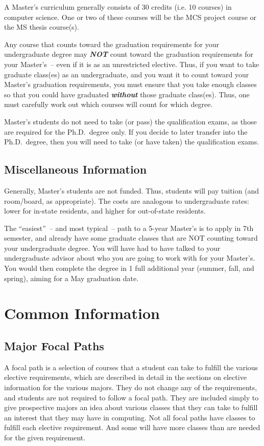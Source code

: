 \documentclass[10pt,letter]{book}
\newcommand{\mychapter}[2]{\chapter{#1}\renewcommand{\leftmark}{\textsc{#2}}}
\newcommand{\mysection}[1]{\section{#1}\renewcommand{\rightmark}{#1}}
\begin{document}
A Master's curriculum generally consists of 30 credits (i.e. 10
courses) in computer science.  One or two of these courses will be the
MCS project course or the MS thesis course(s).

Any course that counts toward the graduation requirements for your
undergraduate degree may {\em\bf NOT} count toward the graduation
requirements for your Master's~-- even if it is as an unrestricted
elective.  Thus, if you want to take graduate class(es) as an
undergraduate, and you want it to count toward your Master's
graduation requirements, you must ensure that you take enough classes
so that you could have graduated {\em\bf without} those graduate
class(es).  Thus, one must carefully work out which courses will count
for which degree.

Master's students do not need to take (or pass) the qualification
exams, as those are required for the Ph.D.\ degree only.  If you
decide to later transfer into the Ph.D.\ degree, then you will need to
take (or have taken) the qualification exams.

\mysection{Miscellaneous Information}

Generally, Master's students are not funded.  Thus, students will pay
tuition (and room/board, as appropriate).  The costs are analogous to
undergraduate rates: lower for in-state residents, and higher for
out-of-state residents.

The ``easiest''~-- and most typical~-- path to a 5-year Master's is to
apply in 7th semester, and already have some graduate classes that are
NOT counting toward your undergraduate degree.  You will have had to
have talked to your undergraduate advisor about who you are going to
work with for your Master's.  You would then complete the degree in 1
full additional year (summer, fall, and spring), aiming for a May
graduation date.


\clearpage
\mychapter{Common Information}{Common Information}

\mysection{Major Focal Paths}

A focal path is a selection of courses that a student can take to
fulfill the various elective requirements, which are described in
detail in the sections on elective information for the various
majors. They do not change any of the requirements, and students are
not required to follow a focal path. They are included simply to give
prospective majors an idea about various classes that they can take to
fulfill an interest that they may have in computing. Not all focal
paths have classes to fulfill each elective requirement. And some will
have more classes than are needed for the given requirement.
\end{document}
